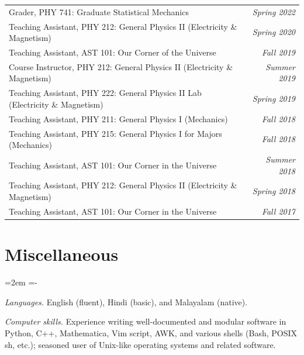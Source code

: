 \documentclass[10pt,article,oneside]{memoir}
\def\hangpars{%
  \leftskip=2em%
  \parindent=-\leftskip%
  \setsecindent{-\leftskip}%
  \setsubsecindent{-\leftskip}%
  \parskip=0.5pt
}
\begin{document}
\begin{tabular}{@{}lr}
  Grader, PHY 741: Graduate Statistical Mechanics                                              & \emph{Spring 2022} \\
  Teaching Assistant, PHY 212: General Physics II (Electricity \& Magnetism)                   & \emph{Spring 2020} \\
  Teaching Assistant, AST 101: Our Corner of the Universe                                      & \emph{Fall 2019}   \\
  Course Instructor, PHY 212: General Physics II (Electricity \& Magnetism)                    & \emph{Summer 2019} \\
  Teaching Assistant, PHY 222: General Physics II Lab (Electricity \& Magnetism)               & \emph{Spring 2019} \\
  Teaching Assistant, PHY 211: General Physics I (Mechanics)                                   & \emph{Fall 2018}   \\
  Teaching Assistant, PHY 215: General Physics I for Majors (Mechanics)                        & \emph{Fall 2018}   \\
  Teaching Assistant, AST 101: Our Corner in the Universe                                      & \emph{Summer 2018} \\
  Teaching Assistant, PHY 212: General Physics II (Electricity \& Magnetism)                   & \emph{Spring 2018} \\
  Teaching Assistant, AST 101: Our Corner in the Universe                                      & \emph{Fall 2017}
\end{tabular}


\section{Miscellaneous}

\hangpars

\emph{Languages.\enspace} English (fluent), Hindi (basic), and Malayalam (native).

\emph{Computer skills.\enspace} Experience writing well-documented and modular software in Python, C++, Mathematica, Vim script, AWK, and various shells (Bash, POSIX sh, etc.); seasoned user of Unix-like operating systems and related software.


\end{document}
